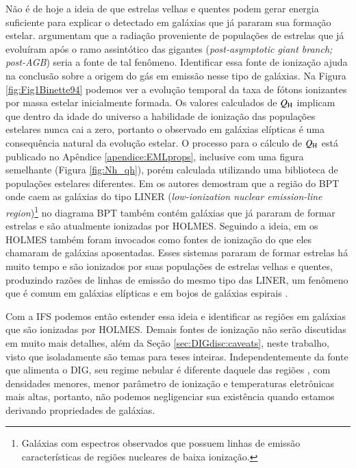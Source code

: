 Não é de hoje a ideia de que estrelas velhas e quentes podem gerar energia suficiente para explicar o \Ha detectado em galáxias que já pararam sua formação estelar. \citet{Binette.etal.1994a} argumentam que a radiação proveniente de populações de estrelas que já evoluíram após o ramo assintótico das gigantes ({\em post-asymptotic giant branch; post-AGB}) seria a fonte de tal fenômeno. Identificar essa fonte de ionização ajuda na conclusão sobre a origem do gás em emissão nesse tipo de galáxias. Na Figura \ref{fig:Fig1Binette94} podemos ver a evolução temporal da taxa de fótons ionizantes por massa estelar inicialmente formada. Os valores calculados de $Q_{\rm H}$ implicam que dentro da idade do universo a habilidade de ionização das populações estelares nunca cai a zero, portanto o \Ha observado em galáxias elípticas é uma consequência natural da evolução estelar. O processo para o cálculo de $Q_{\rm H}$ está publicado no Apêndice \ref{apendice:EMLprops}, inclusive com uma figura semelhante (Figura \ref{fig:Nh_qh}), porém calculada utilizando uma biblioteca de populações estelares diferentes. Em \citet{Stasinska.etal.2008a} os autores demostram que a região do BPT onde caem as galáxias do tipo LINER ({\em low-ionization nuclear emission-line region})\footnote{Galáxias com espectros observados que possuem linhas de emissão características de regiões nucleares de baixa ionização.} no diagrama BPT \citep{Baldwin.Phillips.Terlevich.1981a} também contém galáxias que já pararam de formar estrelas e são atualmente ionizadas por HOLMES. Seguindo a ideia, em \citet{CidFernandes.etal.2011a} os HOLMES também foram invocados como fontes de ionização do que eles chamaram de galáxias aposentadas. Esses sistemas pararam de formar estrelas há muito tempo e são ionizados por suas populações de estrelas velhas e quentes, produzindo razões de linhas de emissão do mesmo tipo das LINER, um fenômeno que é comum em galáxias elípticas e em bojos de galáxias espirais \citep{Sarzi.etal.2010, Gomes.etal.2016a, Belfiore.etal.2016}.

Com a IFS podemos então estender essa ideia e identificar as regiões em galáxias que são ionizadas por HOLMES. Demais fontes de ionização não serão discutidas em muito mais detalhes, além da Seção \ref{sec:DIGdisc:caveats}, neste trabalho, visto que isoladamente são temas para teses inteiras. Independentemente da fonte que alimenta o DIG, seu regime nebular é diferente daquele das regiões \hii, com densidades menores, menor parâmetro de ionização e temperaturas eletrônicas mais altas, portanto, não podemos negligenciar sua existência quando estamos derivando propriedades de galáxias.


